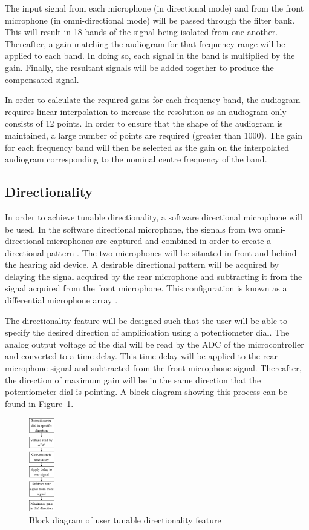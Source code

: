 \documentclass[10pt,twocolumn]{witseiepaper}
\begin{document}
The input signal from each microphone (in directional mode) and from the front microphone (in omni-directional mode) will be passed through the filter bank. This will result in 18 bands of the signal being isolated from one another. Thereafter, a gain matching the audiogram for that frequency range will be applied to each band. In doing so, each signal in the band is multiplied by the gain. Finally, the resultant signals will be added together to produce the compensated signal. 

In order to calculate the required gains for each frequency band, the audiogram requires linear interpolation to increase the resolution as an audiogram only consists of 12 points. In order to ensure that the shape of the audiogram is maintained, a large number of points are required (greater than 1000). The gain for each frequency band will then be selected as the gain on the interpolated audiogram corresponding to the nominal centre frequency of the band.

\subsection{Directionality} \label{sec:directionality}
In order to achieve tunable directionality, a software directional microphone will be used. In the software directional microphone, the signals from two omni-directional microphones are captured and combined in order to create a directional pattern \cite{Distortion_of_interaural_time_cues}. The two microphones will be situated in front and behind the hearing aid device. A desirable directional pattern will be acquired by delaying the signal acquired by the rear microphone and subtracting it from the signal acquired from the front microphone. This configuration is known as a differential microphone array \cite{Distortion_of_interaural_time_cues}.

The directionality feature will be designed such that the user will be able to specify the desired direction of amplification using a potentiometer dial. The analog output voltage of the dial will be read by the ADC of the microcontroller and converted to a time delay. This time delay will be applied to the rear microphone signal and subtracted from the front microphone signal. Thereafter, the direction of maximum gain will be in the same direction that the potentiometer dial is pointing. A block diagram showing this process can be found in Figure~\ref{fig:directionalityBlockDiagram}.
\begin{figure}[h]
	\centering
	\includegraphics[width=0.1\textwidth]{directionalityBlockDiagram.png}
	\caption{Block diagram of user tunable directionality feature}
	\raggedright
	\label{fig:directionalityBlockDiagram}	
\end{figure}
\end{document}
